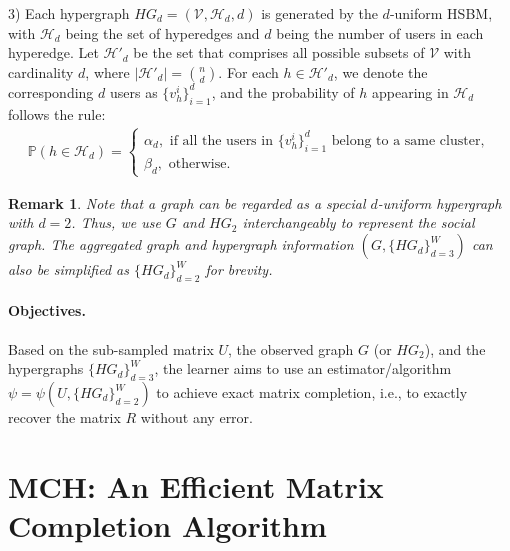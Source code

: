 \documentclass{article}
\newtheorem{remark}{Remark}
\begin{document}
3) Each hypergraph $HG_d = (\mathcal{V}, \mathcal{H}_d, d) $ is generated by the $d$-uniform HSBM, with $\mathcal{H}_d$ being the set of hyperedges and $d$ being the number of users in each hyperedge. Let $\mathcal{H}'_d$ be the set that comprises all possible subsets of $\mathcal{V}$ with cardinality $d$, where $|\mathcal{H}'_d| = \binom{n}{d}$. 
For each $h \in \mathcal{H}'_d$, we denote the corresponding $d$ users as $\{v_{h}^i\}_{i=1}^{d}$, and the probability of $h$ appearing in $\mathcal{H}_d$ follows the rule:
\begin{align*}
   \mathbb{P}(h \in \mathcal{H}_d) = \begin{cases}
   \alpha_d, \text{ \ \ \ if all the users in } \{v_{h}^i\}_{i=1}^d \text{ belong to a same cluster},\\  
   \beta_d, \text{ \  \ \ otherwise}.
   \end{cases}
\end{align*}


\begin{remark}
    Note that a graph can be regarded as a special $d$-uniform hypergraph with $d = 2$. Thus, we use $G$ and $HG_2$ interchangeably to represent the social graph. The aggregated graph and hypergraph information $(G, \{HG_d\}_{d=3}^W)$ can also be simplified  as $\{HG_d\}_{d=2}^W$ for brevity.
\end{remark}



\paragraph{Objectives.} Based on the sub-sampled matrix $U$, the observed graph $G$ (or $HG_2$), and the hypergraphs $\{HG_d \}_{d=3}^{W}$, the learner aims to use an estimator/algorithm $\psi = \psi(U,\{HG_d \}_{d=2}^{W})$ to achieve exact matrix completion, i.e., to exactly recover the matrix $R$ without any error. 

\section{MCH: An Efficient Matrix Completion Algorithm}\label{sec:MCH}
\end{document}
